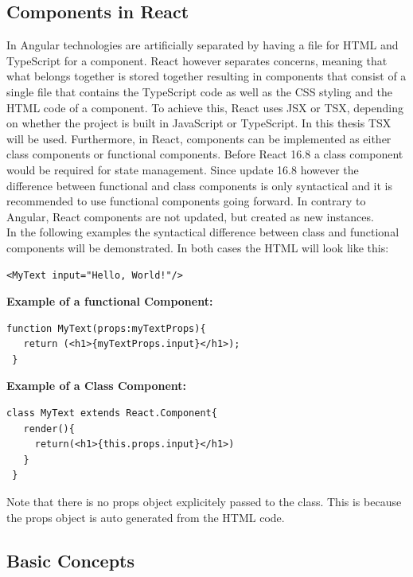 \subsection{Components in React}
In Angular technologies are artificially separated by having a file for HTML and TypeScript for a component. React however separates concerns, meaning that what belongs together is stored together resulting in components that consist of a single file that contains the TypeScript code as well as the CSS styling and the HTML code of a component. To achieve this, React uses JSX or TSX, depending on whether the project is built in JavaScript or TypeScript. In this thesis TSX will be used. Furthermore, in React, components can be implemented as either class components or functional components. Before React 16.8 a class component would be required for state management. Since update 16.8 however the difference between functional and class components is only syntactical and it is recommended to use functional components going forward. In contrary to Angular, React components are not updated, but created as new instances.\\[0.5cm]
In the following examples the syntactical difference between class and functional components will be demonstrated. In both cases the HTML will look like this:
\begin{Verbatim}[frame=single]
 <MyText input="Hello, World!"/>
\end{Verbatim}
\textbf{Example of a functional Component:}
\begin{Verbatim}[frame=single]
 function MyText(props:myTextProps){
   return (<h1>{myTextProps.input}</h1>);
 }
\end{Verbatim}
\textbf{Example of a Class Component:}
\begin{Verbatim}[frame=single]
 class MyText extends React.Component{
   render(){
     return(<h1>{this.props.input}</h1>)
   }			
 }
\end{Verbatim}
Note that there is no props object explicitely passed to the class. This is because the props object is auto generated from the HTML code.
\subsection{Basic Concepts}
